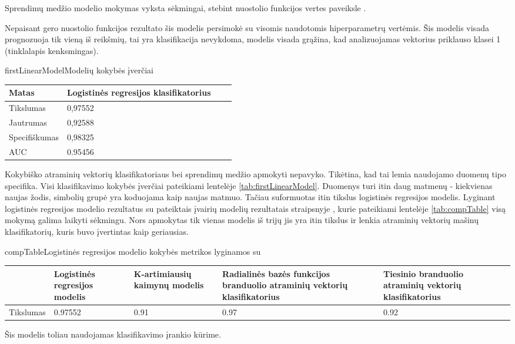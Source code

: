 Sprendimų medžio modelio mokymas vyksta sėkmingai, stebint nuostolio funkcijos vertes paveiksle .

Nepaisant gero nuostolio funkcijos rezultato šis modelis persimokė su visomis naudotomis
hiperparametrų vertėmis. Šis modelis visada prognozuoja tik vieną iš reikšmių, tai yra
klasifikacija nevykdoma, modelis visada grąžina, kad analizuojamas vektorius priklauso klasei 1 (tinklalapis kenksmingas).



\begin{ktutable}{firstLinearModel}{Modelių kokybės įverčiai}
    \begin{tabular}{| l | p{4cm} | p{4cm} | p{4cm} |}
    \hline
               Matas & Logistinės regresijos klasifikatorius \\\hline
               Tikslumas & 0,97552 \\ \hline
               Jautrumas & 0,92588 \\ \hline
               Specifiškumas & 0,98325 \\ \hline
               AUC & 0.95456 \\ \hline
    \end{tabular}
\end{ktutable}

Kokybiško atraminių vektorių klasifikatoriaus bei sprendimų medžio apmokyti nepavyko.
Tikėtina, kad tai lemia naudojamo duomenų tipo specifika. Visi klasifikavimo kokybės įverčiai pateikiami lentelėje \vref{tab:firstLinearModel}. Duomenys turi itin daug
matmenų - kiekvienas naujas žodis, simbolių grupė yra koduojama kaip naujas matmuo.
Tačiau suformuotas itin tikslus logistinės regresijos modelis. Lyginant logistinės regresijos modelio rezultatus
su pateiktais įvairių modelių rezultatais straipsnyje \cite{comp}, kurie pateikiami
lentelėje \vref{tab:compTable} visą mokymą galima laikyti sėkmingu. Nors apmokytas
tik vienas modelis iš trijų jis yra itin tikslus ir lenkia atraminių vektorių mašinų klasifikatorių, kuris buvo įvertintas kaip geriausias.

\begin{ktutable}{compTable}{Logistinės regresijos modelio kokybės metrikos lyginamos su \cite{comp}}
    \begin{tabular}{|l|p{3cm}|p{3cm}|p{3cm}|p{3cm}|}
    \hline
                             & Logistinės regresijos modelis  &  K-artimiausių kaimynų modelis  &  Radialinės bazės funkcijos branduolio atraminių vektorių klasifikatorius  &  Tiesinio branduolio atraminių vektorių klasifikatorius \\ \hline
               Tikslumas     & 0.97552           & 0.91   & 0.97  &  0.92         \\ \hline
    \end{tabular}
\end{ktutable}

Šis modelis toliau naudojamas klasifikavimo įrankio kūrime.

